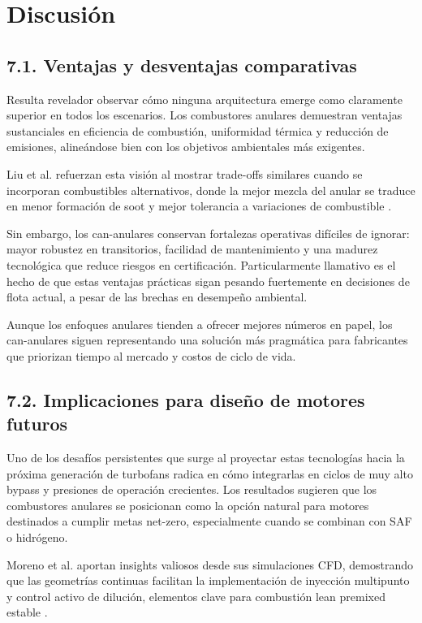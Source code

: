 \section{Discusión}

\subsection{7.1. Ventajas y desventajas comparativas}

Resulta revelador observar cómo ninguna arquitectura emerge como claramente superior en todos los escenarios. Los combustores anulares demuestran ventajas sustanciales en eficiencia de combustión, uniformidad térmica y reducción de emisiones, alineándose bien con los objetivos ambientales más exigentes. 

Liu et al. refuerzan esta visión al mostrar trade-offs similares cuando se incorporan combustibles alternativos, donde la mejor mezcla del anular se traduce en menor formación de soot y mejor tolerancia a variaciones de combustible \cite{Liu2024}. 

Sin embargo, los can-anulares conservan fortalezas operativas difíciles de ignorar: mayor robustez en transitorios, facilidad de mantenimiento y una madurez tecnológica que reduce riesgos en certificación. Particularmente llamativo es el hecho de que estas ventajas prácticas sigan pesando fuertemente en decisiones de flota actual, a pesar de las brechas en desempeño ambiental.

Aunque los enfoques anulares tienden a ofrecer mejores números en papel, los can-anulares siguen representando una solución más pragmática para fabricantes que priorizan tiempo al mercado y costos de ciclo de vida.

\subsection{7.2. Implicaciones para diseño de motores futuros}

Uno de los desafíos persistentes que surge al proyectar estas tecnologías hacia la próxima generación de turbofans radica en cómo integrarlas en ciclos de muy alto bypass y presiones de operación crecientes. Los resultados sugieren que los combustores anulares se posicionan como la opción natural para motores destinados a cumplir metas net-zero, especialmente cuando se combinan con SAF o hidrógeno.

Moreno et al. aportan insights valiosos desde sus simulaciones CFD, demostrando que las geometrías continuas facilitan la implementación de inyección multipunto y control activo de dilución, elementos clave para combustión lean premixed estable \cite{Moreno2024}. 

